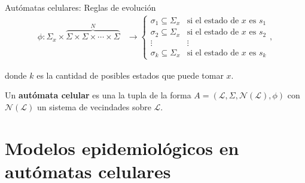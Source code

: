 \documentclass[9pt]{beamer}
\begin{document}
\begin{frame}{Autómatas celulares: Reglas de evolución}
\begin{align*}
    \phi:\Sigma_x\times\overbrace{\Sigma\times\Sigma\times\cdots\times\Sigma}^{N}&\longrightarrow \left\{ \begin{array}{cc}
    \sigma_1 \subseteq \Sigma_x & \text{si el estado de }x\text{ es }s_1 \\
    \sigma_2 \subseteq \Sigma_x & \text{si el estado de }x\text{ es }s_2 \\
    \vdots & \vdots \\
    \sigma_k \subseteq \Sigma_x & \text{si el estado de }x\text{ es }s_k
    \end{array} \right. ,
\end{align*}
    
donde $k$ es la cantidad de posibles estados que puede tomar $x$.
    
Un \textbf{autómata celular} es una la tupla de la forma  $A=(\mathcal{L},\Sigma,\mathcal{N}(\mathcal{L}),\phi)$ con $\mathcal{N}(\mathcal{L})$ un sistema de vecindades sobre $\mathcal{L}$.
\end{frame}

\section{Modelos epidemiológicos en autómatas celulares}
\end{document}
